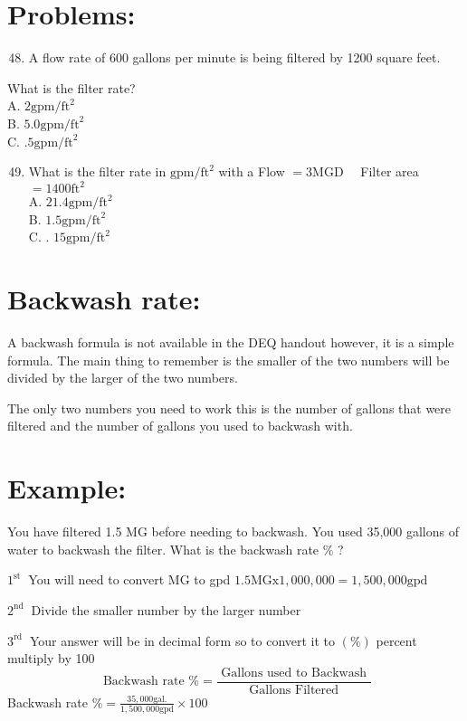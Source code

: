 \begin{enumerate}
\section{Problems:}
\begin{enumerate}
  \setcounter{enumi}{47}
  \item A flow rate of 600 gallons per minute is being filtered by 1200 square feet.
\end{enumerate}
What is the filter rate?\\
A. $2 \mathrm{gpm} / \mathrm{ft}^{2}$\\
B. $5.0 \mathrm{gpm} / \mathrm{ft}^{2}$\\
C. $.5 \mathrm{gpm} / \mathrm{ft}^{2}$

\begin{enumerate}
  \setcounter{enumi}{48}
  \item What is the filter rate in $\mathrm{gpm} / \mathrm{ft}^{2}$ with a Flow $=3 \mathrm{MGD} \quad$ Filter area $=1400 \mathrm{ft}^{2}$\\
A. $21.4 \mathrm{gpm} / \mathrm{ft}^{2}$\\
B. $1.5 \mathrm{gpm} / \mathrm{ft}^{2}$\\
C. . $15 \mathrm{gpm} / \mathrm{ft}^{2}$
\end{enumerate}
\section{Backwash rate:}
A backwash formula is not available in the DEQ handout however, it is a simple formula. The main thing to remember is the smaller of the two numbers will be divided by the larger of the two numbers.

The only two numbers you need to work this is the number of gallons that were filtered and the number of gallons you used to backwash with.

\section{Example:}
You have filtered 1.5 MG before needing to backwash. You used 35,000 gallons of water to backwash the filter. What is the backwash rate $\%$ ?

$1^{\text {st }}$ You will need to convert $\mathrm{MG}$ to gpd $1.5 \mathrm{MGx} 1,000,000=1,500,000 \mathrm{gpd}$

$2^{\text {nd }}$ Divide the smaller number by the larger number

$3^{\text {rd }}$ Your answer will be in decimal form so to convert it to $(\%)$ percent multiply by 100
$$
\text { Backwash rate } \%=\frac{\text { Gallons used to Backwash }}{\text { Gallons Filtered }}
$$
Backwash rate $\%=\frac{35,000 \mathrm{gal} .}{1,500,000 \mathrm{gpd}} \times 100$


\end{enumerate}

